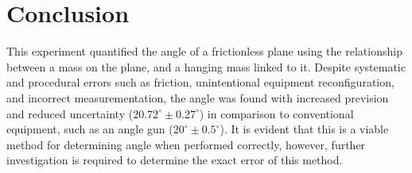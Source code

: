 \documentclass[11pt,a4paper]{article}
\begin{document}
\section{Conclusion}
This experiment quantified the angle of a frictionless plane using the relationship between a mass on the plane, and a hanging mass linked to it. Despite systematic and procedural errors such as friction, unintentional equipment reconfiguration, and incorrect measurementation, the angle was found with increased prevision and reduced uncertainty ($20.72^\circ \pm 0.27^\circ$) in comparison to conventional equipment, such as an angle gun ($20^\circ \pm 0.5^\circ$). It is evident that this is a viable method for determining angle when performed correctly, however, further investigation is required to determine the exact error of this method.



\newpage



	
\end{document}
